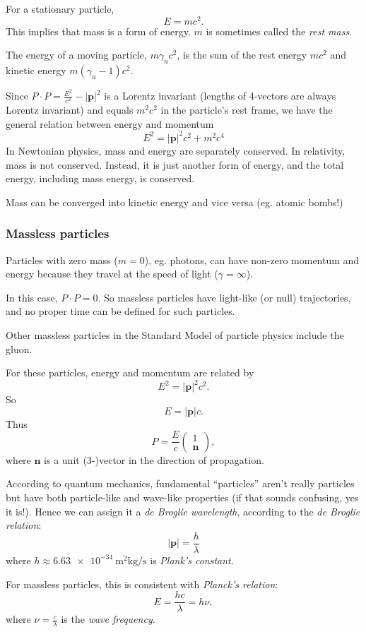 \documentclass[a4paper]{article}
\begin{document}
For a stationary particle,
\[
  E = mc^2.
\] This implies that mass is a form of energy. $m$ is sometimes called the \emph{rest mass}.

The energy of a moving particle, $m\gamma_u c^2$, is the sum of the rest energy $mc^2$ and kinetic energy $m(\gamma_u - 1)c^2$.

Since $P\cdot P = \frac{E^2}{c^2} - |\mathbf{p}|^2$ is a Lorentz invariant (lengths of 4-vectors are always Lorentz invariant) and equals $m^2 c^2$ in the particle's rest frame, we have the general relation between energy and momentum
\[
  E^2 = |\mathbf{p}|^2 c^2 + m^2c^4 
\]
In Newtonian physics, mass and energy are separately conserved. In relativity, mass is not conserved. Instead, it is just another form of energy, and the total energy, including mass energy, is conserved.

Mass can be converged into kinetic energy and vice versa (eg. atomic bombs!)

\subsubsection*{Massless particles}
Particles with zero mass ($m = 0$), eg. photons, can have non-zero momentum and energy because they travel at the speed of light ($\gamma = \infty$).

In this case, $P\cdot P = 0$. So massless particles have light-like (or null) trajectories, and no proper time can be defined for such particles.

Other massless particles in the Standard Model of particle physics include the gluon.

For these particles, energy and momentum are related by
\[
  E^2 = |\mathbf{p}|^2 c^2.
\]
So
\[
  E = |\mathbf{p}|c.
\]
Thus
\[
  P = \frac{E}{c}
  \begin{pmatrix}
    1\\
    \mathbf{n}
  \end{pmatrix},
\]
where $\mathbf{n}$ is a unit (3-)vector in the direction of propagation.

According to quantum mechanics, fundamental ``particles'' aren't really particles but have both particle-like and wave-like properties (if that sounds confusing, yes it is!). Hence we can assign it a \emph{de Broglie wavelength}, according to the \emph{de Broglie relation}:
\[
  |\mathbf{p}| = \frac{h}{\lambda}
\]
where $h \approx \SI{6.63e-34}{\meter\squared\kilogram\per\second}$ is \emph{Plank's constant}.

For massless particles, this is consistent with \emph{Planck's relation}:
\[
  E = \frac{hc}{\lambda} = h\nu,
\]
where $\nu = \frac{c}{\lambda}$ is the \emph{wave frequency}.
\end{document}
